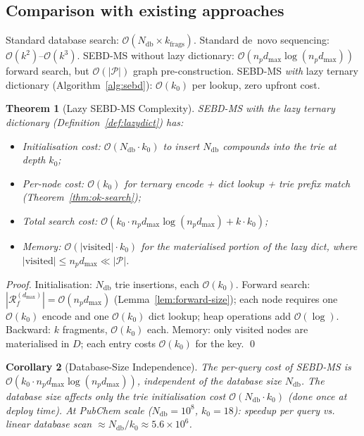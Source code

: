 \documentclass[twocolumn,10pt,a4paper]{article}
\theoremstyle{thmstyle}
\newtheorem{theorem}{Theorem}[section]
\newtheorem{corollary}[theorem]{Corollary}
\theoremstyle{definition}
\theoremstyle{remark}
\newcommand{\Parts}{\mathcal{P}}
\newcommand{\Reachf}{\mathcal{R}_f}
\begin{document}
\subsection{Comparison with existing approaches}

Standard database search: $\mathcal{O}(N_\text{db} \times k_\text{frags})$.
Standard de~novo sequencing: $\mathcal{O}(k^2)$--$\mathcal{O}(k^3)$.
SEBD-MS without lazy dictionary: $\mathcal{O}(n_p d_\text{max} \log(n_p d_\text{max}))$
forward search, but $\mathcal{O}(|\Parts|)$ graph pre-construction.
SEBD-MS \emph{with} lazy ternary dictionary (Algorithm~\ref{alg:sebd}):
$\mathcal{O}(k_0)$ per lookup, zero upfront cost.

\begin{theorem}[Lazy SEBD-MS Complexity]
\label{thm:complexity}
SEBD-MS with the lazy ternary dictionary
(Definition~\ref{def:lazydict}) has:
\begin{itemize}[nosep]
\item \emph{Initialisation cost}: $\mathcal{O}(N_\text{db} \cdot k_0)$
  to insert $N_\text{db}$ compounds into the trie at depth $k_0$;
\item \emph{Per-node cost}: $\mathcal{O}(k_0)$ for ternary encode +
  dict lookup + trie prefix match (Theorem~\ref{thm:ok-search});
\item \emph{Total search cost}: $\mathcal{O}\!\left(k_0 \cdot
  n_p d_\text{max} \log(n_p d_\text{max}) + k \cdot k_0\right)$;
\item \emph{Memory}: $\mathcal{O}(|\text{visited}| \cdot k_0)$
  for the materialised portion of the lazy dict, where
  $|\text{visited}| \leq n_p d_\text{max} \ll |\Parts|$.
\end{itemize}
\end{theorem}

\begin{proof}
Initialisation: $N_\text{db}$ trie insertions, each $\mathcal{O}(k_0)$.
Forward search: $|\Reachf^{(d_\text{max})}| = \mathcal{O}(n_p d_\text{max})$
(Lemma~\ref{lem:forward-size}); each node requires one $\mathcal{O}(k_0)$
encode and one $\mathcal{O}(k_0)$ dict lookup; heap operations add
$\mathcal{O}(\log)$. Backward: $k$ fragments, $\mathcal{O}(k_0)$ each.
Memory: only visited nodes are materialised in $D$; each entry costs
$\mathcal{O}(k_0)$ for the key. \qed
\end{proof}

\begin{corollary}[Database-Size Independence]
\label{cor:db-independent}
The per-query cost of SEBD-MS is $\mathcal{O}(k_0 \cdot n_p d_\text{max}
\log(n_p d_\text{max}))$, \emph{independent of the database size}
$N_\text{db}$.
The database size affects only the trie initialisation cost
$\mathcal{O}(N_\text{db} \cdot k_0)$ (done once at deploy time).
At PubChem scale ($N_\text{db} = 10^8$, $k_0 = 18$):
speedup per query vs. linear database scan $\approx
N_\text{db}/k_0 \approx 5.6 \times 10^6$.
\end{corollary}
\end{document}
